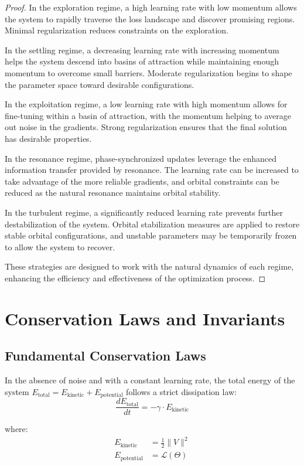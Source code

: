 \begin{proof}
In the exploration regime, a high learning rate with low momentum allows the system to rapidly traverse the loss landscape and discover promising regions. Minimal regularization reduces constraints on the exploration.

In the settling regime, a decreasing learning rate with increasing momentum helps the system descend into basins of attraction while maintaining enough momentum to overcome small barriers. Moderate regularization begins to shape the parameter space toward desirable configurations.

In the exploitation regime, a low learning rate with high momentum allows for fine-tuning within a basin of attraction, with the momentum helping to average out noise in the gradients. Strong regularization ensures that the final solution has desirable properties.

In the resonance regime, phase-synchronized updates leverage the enhanced information transfer provided by resonance. The learning rate can be increased to take advantage of the more reliable gradients, and orbital constraints can be reduced as the natural resonance maintains orbital stability.

In the turbulent regime, a significantly reduced learning rate prevents further destabilization of the system. Orbital stabilization measures are applied to restore stable orbital configurations, and unstable parameters may be temporarily frozen to allow the system to recover.

These strategies are designed to work with the natural dynamics of each regime, enhancing the efficiency and effectiveness of the optimization process.
\end{proof}

\section{Conservation Laws and Invariants}

\subsection{Fundamental Conservation Laws}

\begin{theorem}
In the absence of noise and with a constant learning rate, the total energy of the system $E_{\text{total}} = E_{\text{kinetic}} + E_{\text{potential}}$ follows a strict dissipation law:
\begin{equation}
\frac{dE_{\text{total}}}{dt} = -\gamma \cdot E_{\text{kinetic}}
\end{equation}

where:
\begin{align}
E_{\text{kinetic}} &= \frac{1}{2}\|V\|^2 \\
E_{\text{potential}} &= \mathcal{L}(\Theta)
\end{align}
\end{theorem}

